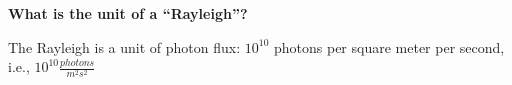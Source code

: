 \textbf{What is the unit of a ``Rayleigh''?}

The Rayleigh is a unit of photon flux: $10^{10}$ photons per square meter
per second, i.e., $10^{10} \frac{photons}{m^{2}s^{2}}$
